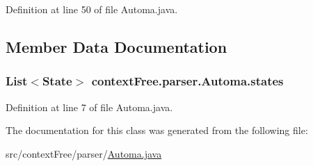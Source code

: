Definition at line 50 of file Automa.\-java.



\subsection{Member Data Documentation}
\hypertarget{classcontext_free_1_1parser_1_1_automa_a5b71afafd71dfa903e36c786618b556d}{
\subsubsection[{states}]{\setlength{\rightskip}{0pt plus 5cm}List$<${\bf State}$>$ {\bf context\-Free.\-parser.\-Automa.\-states}}}\label{classcontext_free_1_1parser_1_1_automa_a5b71afafd71dfa903e36c786618b556d}


Definition at line 7 of file Automa.\-java.



The documentation for this class was generated from the following file\-:\begin{DoxyCompactItemize}
\item 
src/context\-Free/parser/\hyperlink{_automa_8java}{Automa.\-java}\end{DoxyCompactItemize}
